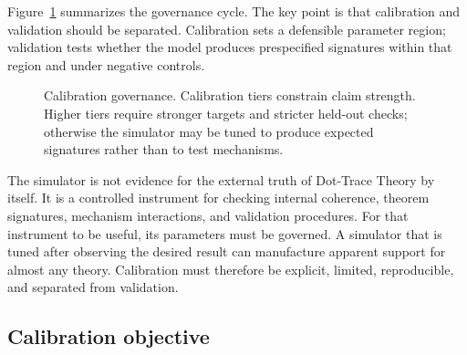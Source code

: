 \documentclass[11pt]{article}
\theoremstyle{remark}
\begin{document}
Figure~\ref{fig:calibration-governance} summarizes the governance cycle. The key point is that calibration and validation should be separated. Calibration sets a defensible parameter region; validation tests whether the model produces prespecified signatures within that region and under negative controls.

\begin{figure}[htbp]
\centering
{}
\caption{Calibration governance. Calibration tiers constrain claim strength. Higher tiers require stronger targets and stricter held-out checks; otherwise the simulator may be tuned to produce expected signatures rather than to test mechanisms.}
\label{fig:calibration-governance}
\end{figure}


The simulator is not evidence for the external truth of Dot-Trace Theory by itself. It is a controlled instrument for checking internal coherence, theorem signatures, mechanism interactions, and validation procedures. For that instrument to be useful, its parameters must be governed. A simulator that is tuned after observing the desired result can manufacture apparent support for almost any theory. Calibration must therefore be explicit, limited, reproducible, and separated from validation.

\subsection{Calibration objective}\label{calibration-objective}
\end{document}
